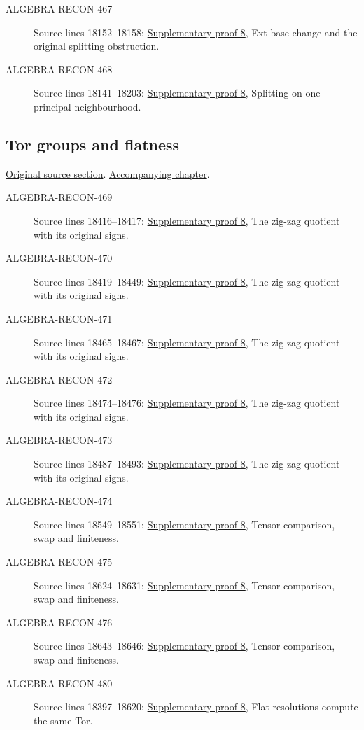\begin{description}
\item[ALGEBRA-RECON-467] Source lines 18152--18158: \hyperlink{algebra_depth_tor_projective_notes_20260927}{Supplementary proof 8}, Ext base change and the original splitting obstruction.
\item[ALGEBRA-RECON-468] Source lines 18141--18203: \hyperlink{algebra_depth_tor_projective_notes_20260927}{Supplementary proof 8}, Splitting on one principal neighbourhood.
\end{description}

\subsection{Tor groups and flatness}
\hypertarget{algebra-source-section-tor}{}
\noindent\href{https://github.com/stacks/stacks-project/blob/a04446e57ec1fbc252a871afcec7752fb2807b14/algebra.tex\#L18215}{Original source section}. \href{algebra.pdf\#nameddest=section-tor}{Accompanying chapter}.

\begin{description}
\item[ALGEBRA-RECON-469] Source lines 18416--18417: \hyperlink{algebra_depth_tor_projective_notes_20260927}{Supplementary proof 8}, The zig-zag quotient with its original signs.
\item[ALGEBRA-RECON-470] Source lines 18419--18449: \hyperlink{algebra_depth_tor_projective_notes_20260927}{Supplementary proof 8}, The zig-zag quotient with its original signs.
\item[ALGEBRA-RECON-471] Source lines 18465--18467: \hyperlink{algebra_depth_tor_projective_notes_20260927}{Supplementary proof 8}, The zig-zag quotient with its original signs.
\item[ALGEBRA-RECON-472] Source lines 18474--18476: \hyperlink{algebra_depth_tor_projective_notes_20260927}{Supplementary proof 8}, The zig-zag quotient with its original signs.
\item[ALGEBRA-RECON-473] Source lines 18487--18493: \hyperlink{algebra_depth_tor_projective_notes_20260927}{Supplementary proof 8}, The zig-zag quotient with its original signs.
\item[ALGEBRA-RECON-474] Source lines 18549--18551: \hyperlink{algebra_depth_tor_projective_notes_20260927}{Supplementary proof 8}, Tensor comparison, swap and finiteness.
\item[ALGEBRA-RECON-475] Source lines 18624--18631: \hyperlink{algebra_depth_tor_projective_notes_20260927}{Supplementary proof 8}, Tensor comparison, swap and finiteness.
\item[ALGEBRA-RECON-476] Source lines 18643--18646: \hyperlink{algebra_depth_tor_projective_notes_20260927}{Supplementary proof 8}, Tensor comparison, swap and finiteness.
\item[ALGEBRA-RECON-480] Source lines 18397--18620: \hyperlink{algebra_depth_tor_projective_notes_20260927}{Supplementary proof 8}, Flat resolutions compute the same Tor.
\end{description}

